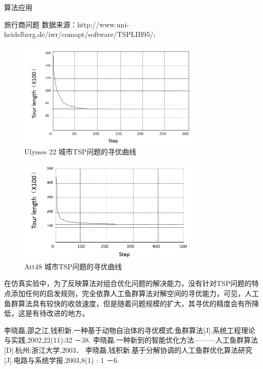 \documentclass[a4paper, 11pt]{article}
\begin{document}
\begin{section}{算法应用}
\begin{subsection}{旅行商问题}
	数据来源：http://www.uni-heidelberg.de/iwr/comopt/software/TSPLIB95/;
	\begin{figure}[htbp]
		\centering
		\includegraphics[width=0.8\textwidth]{../pic/fish4.png}
		\caption{Ulysses 22 城市TSP问题的寻优曲线}
	\end{figure}
	\begin{figure}[htbp]
		\centering
		\includegraphics[width=0.8\textwidth]{../pic/fish5.png}
		\caption{Att48 城市TSP问题的寻优曲线}
	\end{figure}
在仿真实验中，为了反映算法对组合优化问题的解决能力，没有针对TSP问题的特点添加任何的启发规则，完全依靠人工鱼群算法对解空间的寻优能力，可见，人工鱼群算法具有较快的收敛速度，但是随着问题规模的扩大，其寻优的精度会有所降低，这是有待改进的地方。
\end{subsection}


	\begin{thebibliography}{123} 
	 李晓磊,邵之江,钱积新.一种基于动物自治体的寻优模式:鱼群算法[J].系统工程理论与实践,2002,22(11):32 －38.
	 李晓磊.一种新到的智能优化方法———人工鱼群算法[D].杭州:浙江大学,2003．
	李晓磊,钱积新.基于分解协调的人工鱼群优化算法研究[J].电路与系统学报,2003,8(1) : 1 －6.
	\end{thebibliography}

\end{section}
\end{document}
